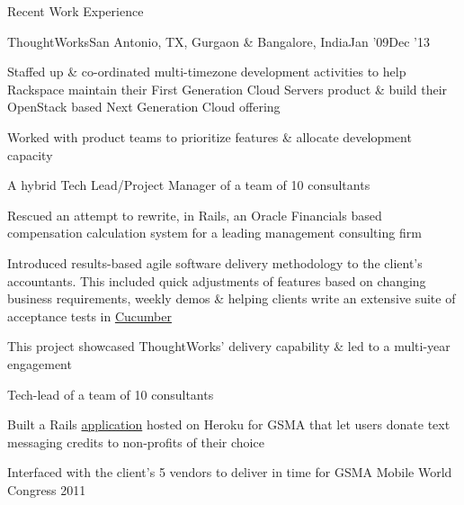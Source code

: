 \documentclass{resume} %
\begin{document}
\begin{rSection}{Recent Work Experience}
\begin{rSubsection}{ThoughtWorks}{San Antonio, TX, Gurgaon \& Bangalore, India}{Jan '09}{Dec '13}
  \item Staffed up \& co-ordinated multi-timezone development activities to help Rackspace maintain their First Generation Cloud Servers product \& build their OpenStack based Next Generation Cloud offering
    \item Worked with product teams to prioritize features \& allocate development capacity
\end{rSubsection}\vspace{-1em}


\begin{rSubsection}{}{}{}{}
  {A hybrid Tech Lead/Project Manager of a team of 10 consultants}

\item Rescued an attempt to rewrite, in Rails, an Oracle Financials based compensation calculation system for a leading management consulting firm
\item Introduced results-based agile software delivery
  methodology to the client's accountants. This included quick
  adjustments of features based on changing business requirements,
  weekly demos \& helping clients write an extensive suite
  of acceptance tests in \href{https://cucumber.io/}{Cucumber}
\item This project showcased ThoughtWorks' delivery capability \& led to a multi-year engagement

\end{rSubsection}\vspace{-1em}


\begin{rSubsection}{}{}{}{}{Tech-lead of a team of 10 consultants}
\item Built a Rails \href{https://github.com/TheHiveProjects}{application} hosted on Heroku for GSMA that let users donate text messaging credits to non-profits of their choice
  \item Interfaced with the client's 5 vendors to deliver in time for GSMA Mobile World Congress 2011


\end{rSubsection}
\end{rSection}
\end{document}
